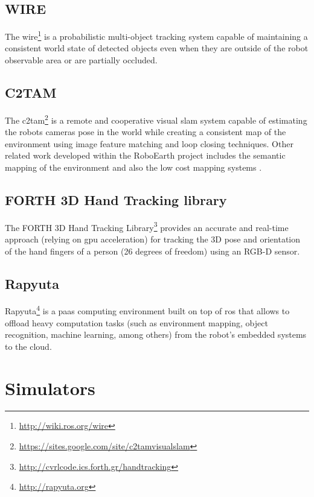 \subsection{WIRE}

The \gls{wire}\footnote{\url{http://wiki.ros.org/wire}} \cite{Elfring2013} is a probabilistic multi-object tracking system capable of maintaining a consistent world state of detected objects even when they are outside of the robot observable area or are partially occluded.


\subsection{C2TAM}

The \gls{c2tam}\footnote{\url{https://sites.google.com/site/c2tamvisualslam}} \cite{Riazuelo2014} is a remote and cooperative visual \gls{slam} system capable of estimating the robots cameras pose in the world while creating a consistent map of the environment using image feature matching and loop closing techniques. Other related work developed within the RoboEarth project includes the semantic mapping of the environment \cite{Riazuelo2015} and also the low cost mapping systems \cite{Mohanarajah2015}.


\subsection{FORTH 3D Hand Tracking library}

The FORTH 3D Hand Tracking Library\footnote{\url{http://cvrlcode.ics.forth.gr/handtracking}} \cite{Oikonomidis2011,Kyriazis2012} provides an accurate and real-time approach (relying on \gls{gpu} acceleration) for tracking the 3D pose and orientation of the hand fingers of a person (26 degrees of freedom) using an RGB-D sensor.


\subsection{Rapyuta}

Rapyuta\footnote{\url{http://rapyuta.org}} \cite{Hunziker2013} is a \gls{paas} computing environment built on top of \gls{ros} that allows to offload heavy computation tasks (such as environment mapping, object recognition, machine learning, among others) from the robot's embedded systems to the cloud.




\section{Simulators}

